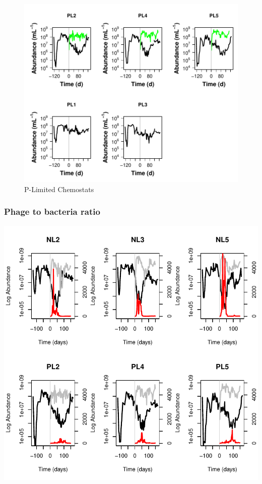 \documentclass[]{article}
\begin{document}
\newpage

\begin{figure}[htbp]
\centering
\includegraphics{analysis_ecoevostoich_files/figure-latex/unnamed-chunk-3-1.pdf}
\caption{P-Limited Chemostats}
\end{figure}

\newpage

\subsubsection{Phage to bacteria ratio}\label{phage-to-bacteria-ratio}

\includegraphics{analysis_ecoevostoich_files/figure-latex/unnamed-chunk-4-1.pdf}
\newpage
\end{document}
